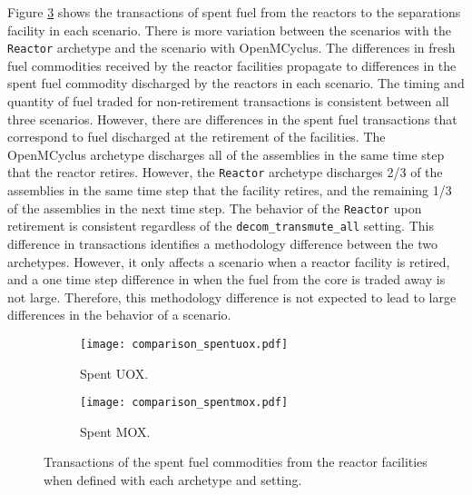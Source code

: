 Figure \ref{fig:comparison_spentfuel} shows the transactions of 
spent fuel from the reactors to the separations facility in each 
scenario. There is more variation between the scenarios with the 
\Cycamore \texttt{Reactor} archetype and the scenario with OpenMCyclus. 
The differences in fresh fuel commodities received by the 
reactor facilities propagate to differences in the spent fuel commodity 
discharged by the reactors in each scenario. The timing and quantity of 
fuel traded for non-retirement transactions is consistent between all 
three scenarios. However, there are differences in the spent fuel 
transactions that correspond to fuel discharged at the retirement of the 
facilities. The OpenMCyclus archetype discharges all of the assemblies 
in the same time step that the reactor retires. However, the \Cycamore 
\texttt{Reactor} archetype discharges 2/3 of the assemblies in the same 
time step that the facility retires, and the remaining 1/3 of the assemblies 
in the next time step. The behavior of the \Cycamore \texttt{Reactor} 
upon retirement is consistent regardless of the \texttt{decom\_transmute\_all}
setting. This difference in transactions identifies a methodology 
difference between the two archetypes. However, it only affects a 
scenario when a reactor facility is retired, and a one time step difference 
in when the fuel from the core is traded away is not large. Therefore, 
this methodology difference is not expected to lead to large differences 
in the behavior of a scenario. 

\begin{figure}
    \centering
    \begin{subfigure}[b]{0.48\textwidth}
        \centering
        \texttt{[image: comparison\_spentuox.pdf]}
        \caption{Spent UOX.}
        \label{fig:comparison_spentuox}
    \end{subfigure}
    \hfill
    \begin{subfigure}[b]{0.48\textwidth}
        \centering
        \texttt{[image: comparison\_spentmox.pdf]}
        \caption{Spent MOX.}
        \label{fig:comparison_spentmox}
    \end{subfigure}
       \caption{Transactions of the spent fuel commodities from the 
       reactor facilities when defined with each archetype and 
       setting.}
       \label{fig:comparison_spentfuel}
\end{figure}

